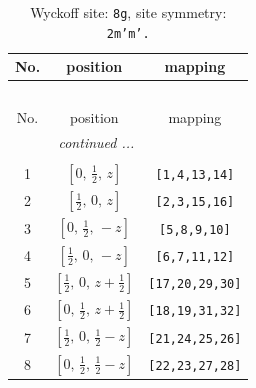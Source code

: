 \documentclass[fleqn,8pt]{jsarticle}
\begin{document}
\begin{longtable}{ccc}
\caption{Wyckoff site: {\tt 8g}, site symmetry: {\tt 2m'm'.}}
 \\
 \hline \hline
No. & position & mapping \\ \hline \endfirsthead

\multicolumn{2}{l}{\tablename\ \thetable{}} \\
 \hline \hline
No. & position & mapping \\ \hline \endhead

 \hline \hline
\multicolumn{2}{r}{\footnotesize\it continued ...} \\ \endfoot

 \hline \hline
\multicolumn{2}{r}{} \\ \endlastfoot

1 & $\left[ 0,\, \frac{1}{2},\, z \right]$ & {\tt [1,4,13,14]} \\ \hline
2 & $\left[ \frac{1}{2},\, 0,\, z \right]$ & {\tt [2,3,15,16]} \\ \hline
3 & $\left[ 0,\, \frac{1}{2},\, - z \right]$ & {\tt [5,8,9,10]} \\ \hline
4 & $\left[ \frac{1}{2},\, 0,\, - z \right]$ & {\tt [6,7,11,12]} \\ \hline
5 & $\left[ \frac{1}{2},\, 0,\, z + \frac{1}{2} \right]$ & {\tt [17,20,29,30]} \\ \hline
6 & $\left[ 0,\, \frac{1}{2},\, z + \frac{1}{2} \right]$ & {\tt [18,19,31,32]} \\ \hline
7 & $\left[ \frac{1}{2},\, 0,\, \frac{1}{2} - z \right]$ & {\tt [21,24,25,26]} \\ \hline
8 & $\left[ 0,\, \frac{1}{2},\, \frac{1}{2} - z \right]$ & {\tt [22,23,27,28]} \\
\end{longtable}
\renewcommand{\arraystretch}{1.2}
\end{document}
